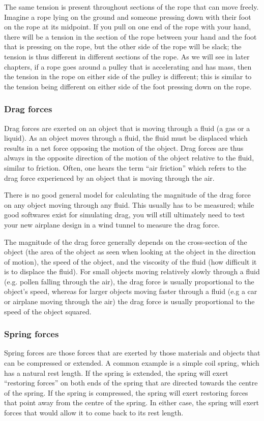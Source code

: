 The same tension is present throughout sections of the rope that can move freely. Imagine a rope lying on the ground and someone pressing down with their foot on the rope at its midpoint. If you pull on one end of the rope with your hand, there will be a tension in the section of the rope between your hand and the foot that is pressing on the rope, but the other side of the rope will be slack; the tension is thus different in different sections of the rope. As we will see in later chapters, if a rope goes around a pulley that is accelerating and has mass, then the tension in the rope on either side of the pulley is different; this is similar to the tension being different on either side of the foot pressing down on the rope. 

\subsubsection{Drag forces}
Drag forces are exerted on an object that is moving through a fluid (a gas or a liquid). As an object moves through a fluid, the fluid must be displaced which results in a net force opposing the motion of the object. Drag forces are thus always in the opposite direction of the motion of the object relative to the fluid, similar to friction. Often, one hears the term ``air friction'' which refers to the drag force experienced by an object that is moving through the air. 

There is no good general model for calculating the magnitude of the drag force on any object moving through any fluid. This usually has to be measured; while good softwares exist for simulating drag, you will still ultimately need to test your new airplane design in a wind tunnel to measure the drag force.

 The magnitude of the drag force generally depends on the cross-section of the object (the area of the object as seen when looking at the object in the direction of motion), the speed of the object, and the viscosity of the fluid (how difficult it is to displace the fluid). For small objects moving relatively slowly through a fluid (e.g. pollen falling through the air), the drag force is usually proportional to the object's speed, whereas for larger objects moving faster through a fluid (e.g a car or airplane moving through the air) the drag force is usually proportional to the speed of the object squared.

\subsubsection{Spring forces}
Spring forces are those forces that are exerted by those materials and objects that can be compressed or extended. A common example is a simple coil spring, which has a natural rest length. If the spring is extended, the spring will exert ``restoring forces'' on both ends of the spring that are directed towards the centre of the spring. If the spring is compressed, the spring will exert restoring forces that point away from the centre of the spring. In either case, the spring will exert forces that would allow it to come back to its rest length.

